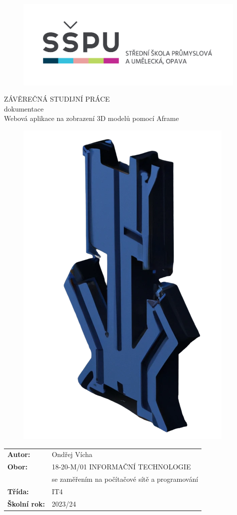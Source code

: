 \documentclass[12pt, a4paper,
twoside,        %
openright
]{report}
\title{\nazevPrace} %
\author{\jmenoAutora} %
\date{\datumOdevzdani} %
\newcommand\obor{INFORMAČNÍ TECHNOLOGIE} %
\newcommand\kodOboru{18-20-M/01} %
\newcommand\zamereni{se zaměřením na počítačové sítě a programování} %
\newcommand\trida{IT4} %
\newcommand\jmenoAutora{Ondřej Vícha}  %
\newcommand\skolniRok{2023/24} %
\newcommand\nazevPrace{Webová aplikace na zobrazení 3D modelů pomocí Aframe} %
\begin{document}
	
	\pagestyle{empty}
	
	\cleardoublepage

	
	{\selectfont
		\begin{figure}[h]
			\centering
			\includegraphics[width=0.6\linewidth]{image/logo-skoly.png} 
		\end{figure}
		
		
		{\bfseries %
			\begin{center}
				\vspace{0.025 \textheight}
				\LARGE{ZÁVĚREČNÁ STUDIJNÍ PRÁCE}\\
				\large{dokumentace}\\
				\vspace{0.075 \textheight}
				\LARGE {\nazevPrace}\\
			\end{center}  
		}%
		
		\begin{figure}[h]
			\centering
			\includegraphics[width=0.2\linewidth]{image/logo-background.png} 
		\end{figure}
		
		\vspace{0.02 \textheight}
		\begin{table}[h!]
			\begin{tabular}{ll}
				\textbf{Autor:} & \jmenoAutora\\ 
				\textbf{Obor:} & \kodOboru { } \obor\\
				\textbf{} & \zamereni\\
				\textbf{Třída:} & \trida\\
				\textbf{Školní rok:} & \skolniRok\\
			\end{tabular}
			
		\end{table}		
	}
	
\end{document}
